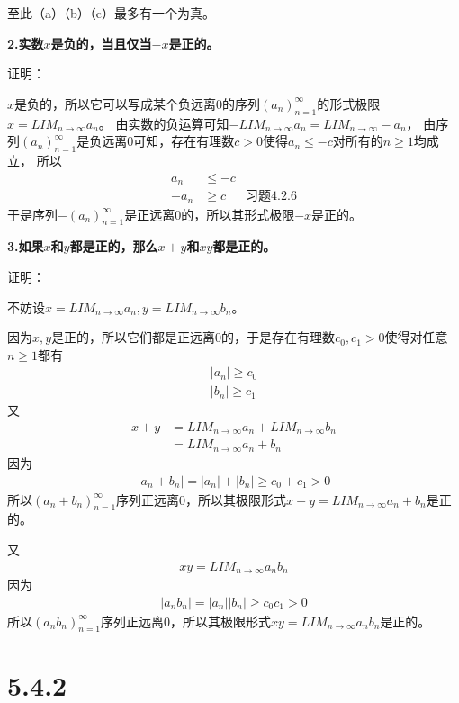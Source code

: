 \documentclass{article}
\theoremstyle{mystyle}
\begin{document}
至此（a）（b）（c）最多有一个为真。

\textbf{2.实数$x$是负的，当且仅当$-x$是正的。}

证明：

$x$是负的，所以它可以写成某个负远离0的序列$(a_n)_{n=1}^\infty$的形式极限$x=LIM_{n\rightarrow \infty}a_n$。
由实数的负运算可知$-LIM_{n\rightarrow \infty}a_n = LIM_{n \rightarrow \infty}-a_n$，
由序列$(a_n)_{n=1}^\infty$是负远离0可知，存在有理数$c > 0$使得$a_n \leq -c$对所有的$n \geq 1$均成立，
所以
\begin{align*}
  a_n  & \leq -c                  \\
  -a_n & \geq c  & \text{习题4.2.6}
\end{align*}
于是序列$-(a_n)_{n=1}^\infty$是正远离0的，所以其形式极限$-x$是正的。

\textbf{3.如果$x$和$y$都是正的，那么$x+y$和$xy$都是正的。}

证明：

不妨设$x=LIM_{n \rightarrow \infty}a_n, y = LIM_{n \rightarrow \infty}b_n$。

因为$x,y$是正的，所以它们都是正远离0的，于是存在有理数$c_0,c_1 > 0$使得对任意$n \geq 1$都有
\begin{align}
  |a_n| \geq c_0 \\
  |b_n| \geq c_1
\end{align}
又
\begin{align*}
  x + y & = LIM_{n \rightarrow \infty}a_n + LIM_{n \rightarrow \infty}b_n \\
        & = LIM_{n \rightarrow \infty} a_n + b_n
\end{align*}
因为
\begin{align*}
  |a_n + b_n| = |a_n| + |b_n| \geq c_0 + c_1 > 0
\end{align*}
所以$(a_n+b_n)_{n=1}^\infty$序列正远离0，所以其极限形式$x+y=LIM_{n \rightarrow \infty} a_n + b_n$是正的。

又
\begin{align*}
  xy = LIM_{n \rightarrow \infty} a_nb_n
\end{align*}
因为
\begin{align*}
  |a_nb_n| = |a_n||b_n| \geq c_0c_1 > 0
\end{align*}
所以$(a_nb_n)_{n=1}^\infty$序列正远离0，所以其极限形式$xy=LIM_{n \rightarrow \infty} a_nb_n$是正的。

\section*{5.4.2}
\end{document}
